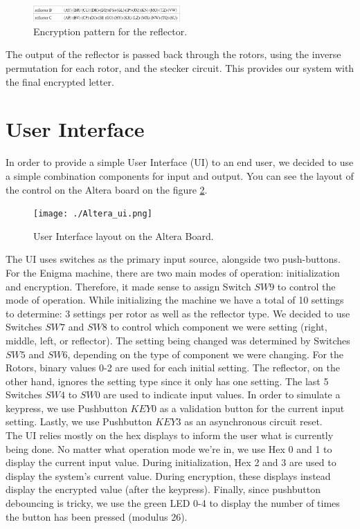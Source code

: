 \documentclass[10pt]{article}
\begin{document}
\begin{figure}[!htb]
    \centering
    \includegraphics[width=0.5\textwidth]{./reflector_encryption.png}
    \caption{Encryption pattern for the reflector.}
    \label{fig:reflector_encryption}
\end{figure}
\newline
The output of the reflector is passed back through the rotors, using the inverse permutation for each rotor, and the stecker circuit. This provides our system with the final encrypted letter.

\section{User Interface}
In order to provide a simple User Interface (UI) to an end user, we decided to use a simple combination components for input and output. You can see the layout of the control on the Altera board on the figure \ref{fig:Altera_ui}.\\
\begin{figure}[!htb]
    \centering
    \texttt{[image: ./Altera\_ui.png]}
    \caption{User Interface layout on the Altera Board.}
    \label{fig:Altera_ui}
\end{figure}
\newpage
The UI uses switches as the primary input source, alongside two push-buttons. For the Enigma machine, there are two main modes of operation: initialization and encryption. Therefore, it made sense to assign Switch $SW9$ to control the mode of operation. While initializing the machine we have a total of 10 settings to determine: 3 settings per rotor as well as the reflector type. We decided to use Switches $SW7$ and $SW8$ to control which component we were setting (right, middle, left, or reflector). The setting being changed was determined by Switches $SW5$ and $SW6$, depending on the type of component we were changing. For the Rotors, binary values 0-2 are used for each initial setting. The reflector, on the other hand, ignores the setting type since it only has one setting. The last 5 Switches $SW4$ to $SW0$ are used to indicate input values. In order to simulate a keypress, we use Pushbutton $KEY0$ as a validation button for the current input setting. Lastly, we use Pushbutton $KEY3$ as an asynchronous circuit reset.\\

The UI relies mostly on the hex displays to inform the user what is currently being done. No matter what operation mode we're in, we use Hex 0 and 1 to display the current input value. During initialization, Hex 2 and 3 are used to display the system's current value. During encryption, these displays instead display the encrypted value (after the keypress). Finally, since pushbutton debouncing is tricky, we use the green LED 0-4 to display the number of times the button has been pressed (modulus 26).\\
\end{document}
